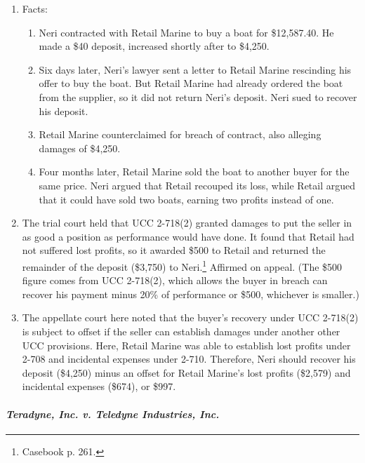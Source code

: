 \begin{enumerate}
    \item Facts:
    \begin{enumerate}
        \item Neri contracted with Retail Marine to buy a boat for 
        \$12,587.40. He made a \$40 deposit, increased shortly after to 
        \$4,250.
        \item Six days later, Neri's lawyer sent a letter to Retail Marine 
        rescinding his offer to buy the boat. But Retail Marine had already 
        ordered the boat from the supplier, so it did not return Neri's 
        deposit. Neri sued to recover his deposit.
        \item Retail Marine counterclaimed for breach of contract, also 
        alleging damages of \$4,250.
        \item Four months later, Retail Marine sold the boat to another buyer 
        for the same price. Neri argued that Retail recouped its loss, while 
        Retail argued that it could have sold two boats, earning two profits 
        instead of one.
    \end{enumerate}
    \item The trial court held that UCC 2-718(2) granted damages to put the 
    seller in as good a position as performance would have done. It found that 
    Retail had not suffered lost profits, so it awarded \$500 to Retail and 
    returned the remainder of the deposit (\$3,750) to Neri.\footnote{Casebook 
    p. 261.} Affirmed on appeal. (The \$500 figure comes from UCC 2-718(2), 
    which allows the buyer in breach can recover his payment minus 20\% of 
    performance or \$500, whichever is smaller.)
    \item The appellate court here noted that the buyer's recovery under UCC 
    2-718(2) is subject to offset if the seller can establish damages under 
    another other UCC provisions. Here, Retail Marine was able to establish 
    lost profits under 2-708 and incidental expenses under 
    2-710. Therefore, Neri should recover his deposit (\$4,250) minus an 
    offset for Retail Marine's lost profits (\$2,579) and incidental expenses 
    (\$674), or \$997.
\end{enumerate}

\paragraph{\emph{Teradyne, Inc. v. Teledyne Industries, Inc.}}

